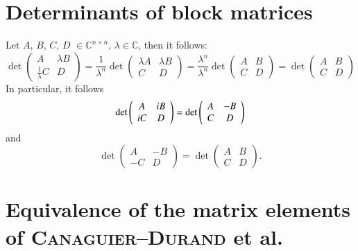 \section{Determinants of block matrices}
\label{appendix_determinant_block_matrices}

Let $A$, $B$, $C$, $D$ $\in \mathbb{C}^{n\times n}$, $\lambda \in \mathbb{C}$, then it follows:
\begin{equation}
\det\left(\begin{array}{cc}
A & \lambda B \\
\frac{1}{\lambda} C & D
\end{array}\right) = 
\frac{1}{\lambda^n} \det\left(\begin{array}{cc}
\lambda A & \lambda B \\
C & D
\end{array}\right) = 
\frac{\lambda^n}{\lambda^n} \det\left(\begin{array}{cc}
A & B \\
C & D
\end{array}\right) = 
\det\left(\begin{array}{cc}
A & B \\
C & D
\end{array}\right)
\end{equation}
In particular, it follows
\begin{equation}
\label{eq:appendix_det_i}
\det\left(\begin{array}{cc}
A & i B \\
i C & D
\end{array}\right) = 
\det\left(\begin{array}{cc}
A & - B \\
C & D
\end{array}\right)
\end{equation}
and
\begin{equation}
\label{eq:appendix_det_m}
\det\left(\begin{array}{cc}
 A & -B \\
-C &  D
\end{array}\right) = 
\det\left(\begin{array}{cc}
A & B \\
C & D
\end{array}\right)\text{.}
\end{equation}


\section{Equivalence of the matrix elements of \textsc{Canaguier--Durand} et al.}
\label{appendix_umrechnung}

